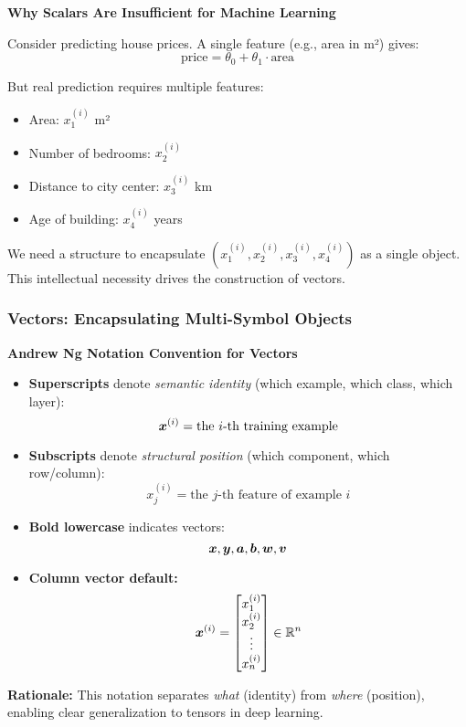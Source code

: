 \begin{intuitionbox}
    \textbf{Why Scalars Are Insufficient for Machine Learning}

    Consider predicting house prices. A single feature (e.g., area in m²) gives:
    \[
        \text{price} = \theta_0 + \theta_1 \cdot \text{area}
    \]

    But real prediction requires multiple features:
    \begin{itemize}
        \item Area: $x_1^{(i)}$ m²
        \item Number of bedrooms: $x_2^{(i)}$
        \item Distance to city center: $x_3^{(i)}$ km
        \item Age of building: $x_4^{(i)}$ years
    \end{itemize}

    We need a structure to encapsulate $(x_1^{(i)}, x_2^{(i)}, x_3^{(i)},
        x_4^{(i)})$ as a single object. This intellectual necessity drives the
    construction of vectors.
\end{intuitionbox}

\subsubsection{Vectors: Encapsulating Multi-Symbol Objects}

\begin{notationbox}
    \textbf{Andrew Ng Notation Convention for Vectors}

    \begin{itemize}
        \item \textbf{Superscripts} denote \textit{semantic identity} (which example, which class, which layer):
              \[
                  \bm{x}^{(i)} = \text{the } i\text{-th training example}
              \]

        \item \textbf{Subscripts} denote \textit{structural position} (which component, which row/column):
              \[
                  x_j^{(i)} = \text{the } j\text{-th feature of example } i
              \]

        \item \textbf{Bold lowercase} indicates vectors:
              \[
                  \bm{x}, \bm{y}, \bm{a}, \bm{b}, \bm{w}, \bm{v}
              \]

        \item \textbf{Column vector default:}
              \[
                  \bm{x}^{(i)} = \begin{bmatrix} x_1^{(i)} \\ x_2^{(i)} \\ \vdots \\ x_n^{(i)} \end{bmatrix} \in \mathbb{R}^{n}
              \]
    \end{itemize}

    \textbf{Rationale:} This notation separates \textit{what} (identity) from \textit{where} (position), enabling clear generalization to tensors in deep learning.
\end{notationbox}

